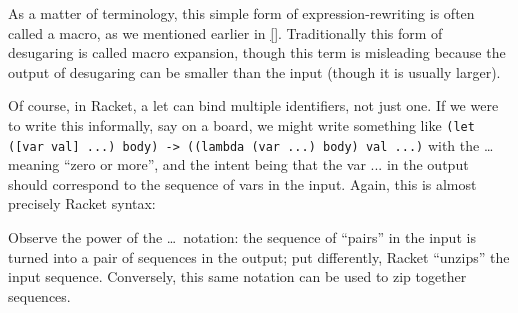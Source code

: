 As a matter of terminology, this simple form of expression-rewriting is often
called a macro, as we mentioned earlier in \ref{}. Traditionally this form of
desugaring is called macro expansion, though this term is misleading because the
output of desugaring can be smaller than the input (though it is usually
larger).

Of course, in Racket, a let can bind multiple identifiers, not just one. If we
were to write this informally, say on a board, we might write something like
\verb|(let ([var val] ...) body) -> ((lambda (var ...) body) val ...)| with the
\ldots meaning “zero or more”, and the intent being that the var ... in the
output should correspond to the sequence of vars in the input. Again, this is
almost precisely Racket syntax:

Observe the power of the \ldots\ notation: the sequence of “pairs” in the input
is turned into a pair of sequences in the output; put differently, Racket
“unzips” the input sequence. Conversely, this same notation can be used to zip
together sequences.
